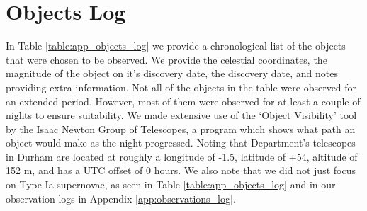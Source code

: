 \documentclass[twocolumn]{revtex4}
\begin{document}
{\section{Objects Log} \label{app:objects_log}
\vspace{-2ex}
In Table \ref{table:app_objects_log} we provide a chronological list of the objects that were chosen to be observed. We provide the celestial coordinates, the magnitude of the object on it's discovery date, the discovery date, and notes providing extra information. Not all of the objects in the table were observed for an extended period. However, most of them were observed for at least a couple of nights to ensure suitability. We made extensive use of the `Object Visibility' tool by the Isaac Newton Group of Telescopes, a program which shows what path an object would make as the night progressed. Noting that Department's telescopes in Durham are located at roughly a longitude of -1.5, latitude of +54\degree, altitude of 152 m, and has a UTC offset of 0 hours.  We also note that we did not just focus on Type Ia supernovae, as seen in Table \ref{table:app_objects_log} and in our observation logs in Appendix \ref{app:observations_log}.

}
\end{document}
